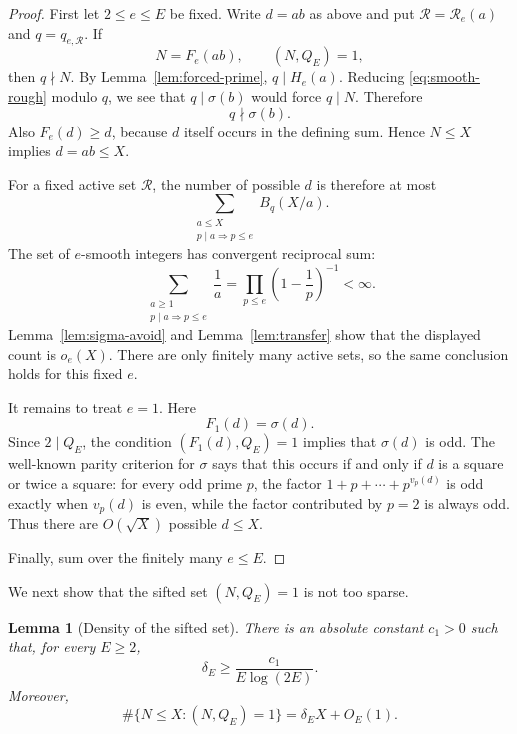 \documentclass[11pt]{article}
\newtheorem{lemma}[theorem]{Lemma}
\theoremstyle{definition}
\theoremstyle{remark}
\begin{document}
\begin{proof}
First let $2\leq e\leq E$ be fixed.  Write $d=ab$ as above and put $\mathcal R=\mathcal R_e(a)$ and $q=q_{e,\mathcal R}$.  If
\[
N=F_e(ab),\qquad (N,Q_E)=1,
\]
then $q\nmid N$.  By Lemma~\ref{lem:forced-prime}, $q\mid H_e(a)$.  Reducing \eqref{eq:smooth-rough} modulo $q$, we see that $q\mid\sigma(b)$ would force $q\mid N$.  Therefore
\[
q\nmid\sigma(b). \tag{5.3}\label{eq:sigma-b-avoid}
\]
Also $F_e(d)\geq d$, because $d$ itself occurs in the defining sum.  Hence $N\leq X$ implies $d=ab\leq X$.

For a fixed active set $\mathcal R$, the number of possible $d$ is therefore at most
\[
\sum_{\substack{a\leq X\\p\mid a\Rightarrow p\leq e}}
B_q(X/a).
\]
The set of $e$-smooth integers has convergent reciprocal sum:
\[
\sum_{\substack{a\geq1\\p\mid a\Rightarrow p\leq e}}\frac1a
=\prod_{p\leq e}\left(1-\frac1p\right)^{-1}<\infty.
\]
Lemma~\ref{lem:sigma-avoid} and Lemma~\ref{lem:transfer} show that the displayed count is $o_e(X)$.  There are only finitely many active sets, so the same conclusion holds for this fixed $e$.

It remains to treat $e=1$.  Here
\[
F_1(d)=\sigma(d).
\]
Since $2\mid Q_E$, the condition $(F_1(d),Q_E)=1$ implies that $\sigma(d)$ is odd.  The well-known parity criterion for $\sigma$ says that this occurs if and only if $d$ is a square or twice a square: for every odd prime $p$, the factor $1+p+\cdots+p^{v_p(d)}$ is odd exactly when $v_p(d)$ is even, while the factor contributed by $p=2$ is always odd.  Thus there are $O(\sqrt X)$ possible $d\leq X$.

Finally, sum over the finitely many $e\leq E$.
\end{proof}

We next show that the sifted set $(N,Q_E)=1$ is not too sparse.

\begin{lemma}[Density of the sifted set]\label{lem:sift-density}
There is an absolute constant $c_1>0$ such that, for every $E\geq2$,
\[
\delta_E\geq \frac{c_1}{E\log(2E)}.
\]
Moreover,
\[
\#\{N\leq X:(N,Q_E)=1\}=\delta_E X+O_E(1).
\]
\end{lemma}
\end{document}
